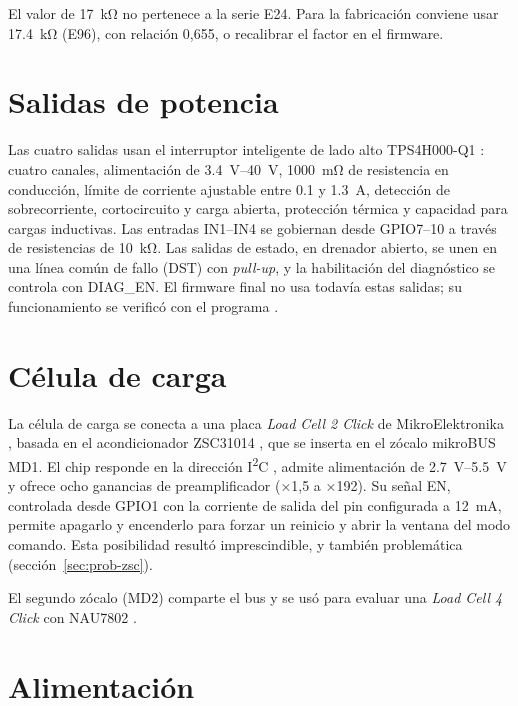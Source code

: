 El valor de \SI{17}{\kilo\ohm} no pertenece a la serie E24. Para la fabricación conviene usar
\SI{17.4}{\kilo\ohm} (E96), con relación 0,655, o recalibrar el factor en el firmware.

\section{Salidas de potencia}

Las cuatro salidas usan el interruptor inteligente de lado alto TPS4H000-Q1 \cite{tps4h000}: cuatro
canales, alimentación de \SIrange{3.4}{40}{\volt}, \SI{1000}{\milli\ohm} de resistencia en
conducción, límite de corriente ajustable entre \num{0.1} y \SI{1.3}{\ampere}, detección de
sobrecorriente, cortocircuito y carga abierta, protección térmica y capacidad para cargas
inductivas. Las entradas IN1--IN4 se gobiernan desde GPIO7--10 a través de resistencias de
\SI{10}{\kilo\ohm}. Las salidas de estado, en drenador abierto, se unen en una línea común de fallo
(DST) con \emph{pull-up}, y la habilitación del diagnóstico se controla con DIAG\_EN. El firmware
final no usa todavía estas salidas; su funcionamiento se verificó con el programa
 .

\section{Célula de carga}

La célula de carga se conecta a una placa \emph{Load Cell 2 Click} de MikroElektronika
\cite{mikroelc2}, basada en el acondicionador ZSC31014 \cite{zsc31014}, que se inserta en el zócalo
mikroBUS MD1. El chip responde en la dirección I\textsuperscript{2}C , admite
alimentación de \SIrange{2.7}{5.5}{\volt} y ofrece ocho ganancias de preamplificador (×1,5 a ×192).
Su señal EN, controlada desde GPIO1 con la corriente de salida del pin configurada a
\SI{12}{\milli\ampere}, permite apagarlo y encenderlo para forzar un reinicio y abrir la ventana del
modo comando. Esta posibilidad resultó imprescindible, y también problemática
(sección~\ref{sec:prob-zsc}).

El segundo zócalo (MD2) comparte el bus y se usó para evaluar una \emph{Load Cell 4 Click} con
NAU7802 \cite{nau7802} .

\section{Alimentación}

